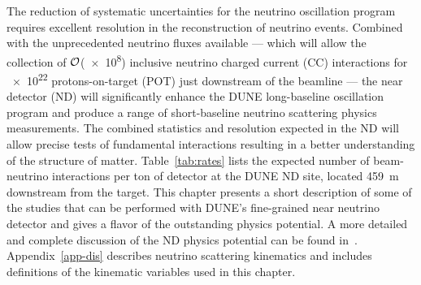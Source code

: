 The reduction of systematic uncertainties for the neutrino oscillation
program %
requires excellent resolution in the
reconstruction of neutrino events. Combined with the unprecedented
neutrino fluxes available %
--- which will
allow the collection of ${\cal{O}}$(\num{e8}) inclusive neutrino charged
current (CC) interactions for %
\num{e22} protons-on-target (POT) just downstream of the
beamline --- the %
near detector (ND)  %
will significantly enhance the DUNE long-baseline 
oscillation program and produce a range of short-baseline neutrino
scattering physics measurements.  The combined statistics and
resolution expected in the ND will allow precise tests of fundamental
interactions resulting in a better understanding of the structure of
matter. 
Table~\ref{tab:rates} lists the expected number of %
beam-neutrino interactions per ton of detector at the DUNE ND site,
located \SI{459}{\meter} downstream from
the %
target.  
This chapter presents a short description of some of the studies that
can be performed with DUNE's fine-grained near neutrino detector
and gives a flavor of the outstanding physics potential. A more
detailed and complete discussion of the ND physics
potential can be found in~\cite{docdb-6704}.
Appendix~\ref{app-dis} describes neutrino scattering 
kinematics and includes
definitions of the kinematic variables used in this chapter.
